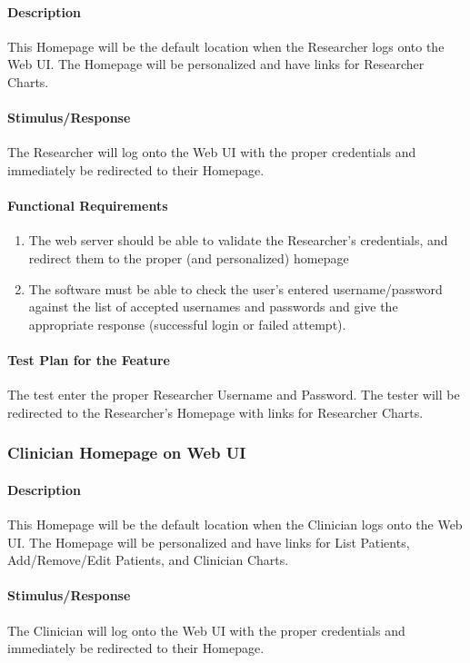 \documentclass{article}
\begin{document}
\paragraph{Description}
This Homepage will be the default location when the Researcher logs onto the Web UI. The Homepage will be personalized and have links for Researcher Charts.

\paragraph{Stimulus/Response}
The Researcher will log onto the Web UI with the proper credentials and immediately be redirected to their Homepage. 

\paragraph{Functional Requirements}
\begin{enumerate}
\item The web server should be able to validate the Researcher's credentials, and redirect them to the proper (and personalized) homepage
\item The software must be able to check the user's entered username/password against the list of accepted usernames and passwords and give the appropriate response (successful login or failed attempt).
\end{enumerate}

\paragraph{Test Plan for the Feature}
The test enter the proper Researcher Username and Password. The tester will be redirected to the Researcher's Homepage with links for Researcher Charts.

\subsubsection{Clinician Homepage on Web UI}\label{sec: Clinician Homepage}

\paragraph{Description}
This Homepage will be the default location when the Clinician logs onto the Web UI. The Homepage will be personalized and have links for List Patients, Add/Remove/Edit Patients, and Clinician Charts.

\paragraph{Stimulus/Response}
The Clinician will log onto the Web UI with the proper credentials and immediately be redirected to their Homepage. 
\end{document}
